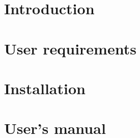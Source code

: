 
\section{Introduction}

\section{User requirements}

\section{Installation}

\section{User's manual}